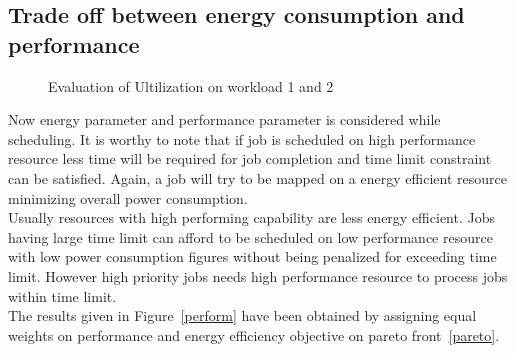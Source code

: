 \subsection{Trade off between energy consumption and performance}
\label{case2}
\begin{figure}[h]
\centering
\caption{ Evaluation of Ultilization on workload 1  and 2}
\end{figure}
Now energy parameter and performance parameter is considered while scheduling. It is worthy to note that if job is scheduled on high performance resource less time will be required for job completion and time limit constraint can be satisfied. Again, a job will try to be mapped on a  energy efficient resource minimizing overall power consumption. \\
Usually resources with high performing capability are less energy efficient. Jobs having large time limit can afford to be scheduled on low performance resource with low power consumption figures without being penalized for exceeding time limit. However high priority jobs needs high performance resource to process jobs within time limit.\\
The results given in Figure~\ref{perform} have been obtained by assigning equal weights on performance and energy efficiency objective on pareto front~\ref{pareto}.
